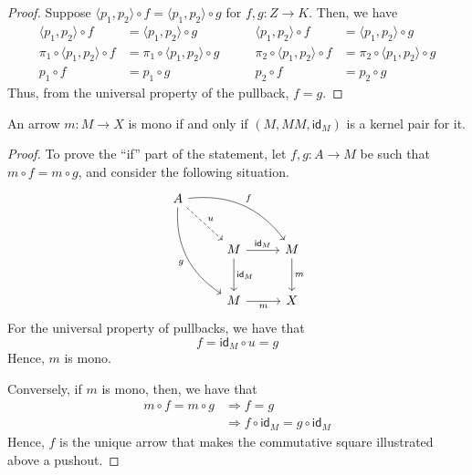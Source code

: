 \documentclass[runningheads,envcountsect]{llncs}
\newcommand{\id}[1]{\mathsf{id}_{#1}}
\begin{document}
\begin{proof}
	Suppose $\langle p_1, p_2 \rangle \circ f = \langle p_1, p_2 \rangle \circ g$ for $f, g: Z \to K$. Then, we have
	\[
		\begin{split}
			\langle p_1, p_2 \rangle \circ f &=  \langle p_1, p_2 \rangle \circ g \\
			\pi_1 \circ \langle p_1, p_2 \rangle \circ f &=  \pi_1 \circ \langle p_1, p_2 \rangle \circ g \\
			p_1 \circ f &= p_1 \circ g
		\end{split}
		\qquad
		\begin{split}
			\langle p_1, p_2 \rangle \circ f &=  \langle p_1, p_2 \rangle \circ g \\
			\pi_2 \circ \langle p_1, p_2 \rangle \circ f &=  \pi_2 \circ \langle p_1, p_2 \rangle \circ g \\
			p_2 \circ f &= p_2 \circ g
		\end{split}
	\]
	Thus, from the universal property of the pullback, $f = g$.
\end{proof}

\begin{proposition}\label{prop:kermono}
	An arrow $m\colon M\to X$ is mono if and only if $(M, MM, \id{M})$ is a kernel pair for it.
\end{proposition}

\begin{proof}
    To prove the ``if'' part of the statement, let $f, g: A \to M$ be such that $m\circ f = m\circ g$, and consider the following situation.
    \[
        \begin{tikzcd}[row sep=26, column sep = 26]
        A \arrow[drr, bend left=30, "f"] \arrow[ddr, bend right=30,"g" swap] \arrow[dr, dashed, "u"] & & \\
        & M  \arrow[d, "{\id{M}}"] \arrow[r, "{\id{M}}"] & M \arrow[d, "m"] \\
        & M  \arrow[r, "m" swap] & X
        \end{tikzcd}
    \]
    For the universal property of pullbacks, we have that $$f  =  \id{M} \circ u =  g$$
    Hence, $m$ is mono.

    Conversely, if $m$ is mono, then, we have that
    \begin{align*}
        m \circ f = m \circ g   &\Rightarrow    f = g \\
                                &\Rightarrow    f \circ \id{M} = g\circ \id{M}
    \end{align*}
    Hence, $f$ is the unique arrow that makes the commutative square illustrated above a pushout.
\end{proof}
\end{document}
